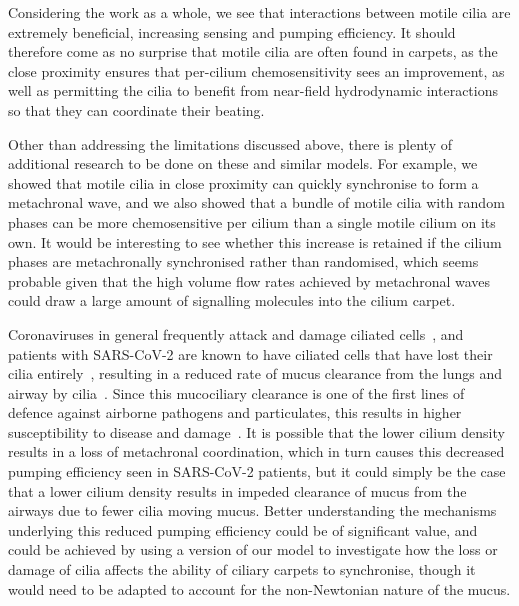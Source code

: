 Considering the work as a whole, we see that interactions between motile cilia are extremely beneficial, increasing sensing and pumping efficiency. It should therefore come as no surprise that motile cilia are often found in carpets, as the close proximity ensures that per-cilium chemosensitivity sees an improvement, as well as permitting the cilia to benefit from near-field hydrodynamic interactions so that they can coordinate their beating.


Other than addressing the limitations discussed above, there is plenty of additional research to be done on these and similar models. For example, we showed that motile cilia in close proximity can quickly synchronise to form a metachronal wave, and we also showed that a bundle of motile cilia with random phases can be more chemosensitive per cilium than a single motile cilium on its own. It would be interesting to see whether this increase is retained if the cilium phases are metachronally synchronised rather than randomised, which seems probable given that the high volume flow rates achieved by metachronal waves could draw a large amount of signalling molecules into the cilium carpet.

Coronaviruses in general frequently attack and damage ciliated cells~, and patients with SARS-CoV-2 are known to have ciliated cells that have lost their cilia entirely~, resulting in a reduced rate of mucus clearance from the lungs and airway by cilia~. Since this mucociliary clearance is one of the first lines of defence against airborne pathogens and particulates, this results in higher susceptibility to disease and damage~. It is possible that the lower cilium density results in a loss of metachronal coordination, which in turn causes this decreased pumping efficiency seen in SARS-CoV-2 patients, but it could simply be the case that a lower cilium density results in impeded clearance of mucus from the airways due to fewer cilia moving mucus. Better understanding the mechanisms underlying this reduced pumping efficiency could be of significant value, and could be achieved by using a version of our model to investigate how the loss or damage of cilia affects the ability of ciliary carpets to synchronise, though it would need to be adapted to account for the non-Newtonian nature of the mucus.

